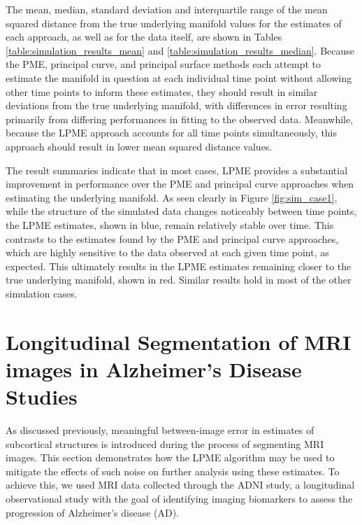 \documentclass[11pt,reqno]{article}
\theoremstyle{definition}
\begin{document}
The mean, median, standard deviation and interquartile range of the mean squared distance from the true underlying manifold values for the estimates of each approach, as well as for the data itself, are shown in Tables \ref{table:simulation_results_mean} and \ref{table:simulation_results_median}. Because the PME, principal curve, and principal surface methods each attempt to estimate the manifold in question at each individual time point without allowing other time points to inform these estimates, they should result in similar deviations from the true underlying manifold, with differences in error resulting primarily from differing performances in fitting to the observed data. Meanwhile, because the LPME approach accounts for all time points simultaneously, this approach should result in lower mean squared distance values.

The result summaries indicate that in most cases, LPME provides a substantial improvement in performance over the PME and principal curve approaches when estimating the underlying manifold. As seen clearly in Figure \ref{fig:sim_case1}, while the structure of the simulated data changes noticeably between time points, the LPME estimates, shown in blue, remain relatively stable over time. This contrasts to the estimates found by the PME and principal curve approaches, which are highly sensitive to the data observed at each given time point, as expected. This ultimately results in the LPME estimates remaining closer to the true underlying manifold, shown in red. Similar results hold in most of the other simulation cases.



\section{Longitudinal Segmentation of MRI images in Alzheimer's Disease Studies}\label{s:application}

As discussed previously, meaningful between-image error in estimates of subcortical structures is introduced during the process of segmenting MRI images. This section demonstrates how the LPME algorithm may be used to mitigate the effects of such noise on further analysis using these estimates. To achieve this, we used MRI data collected through the ADNI study, a longitudinal observational study with the goal of identifying imaging biomarkers to assess the progression of Alzheimer's disease (AD).
\end{document}
